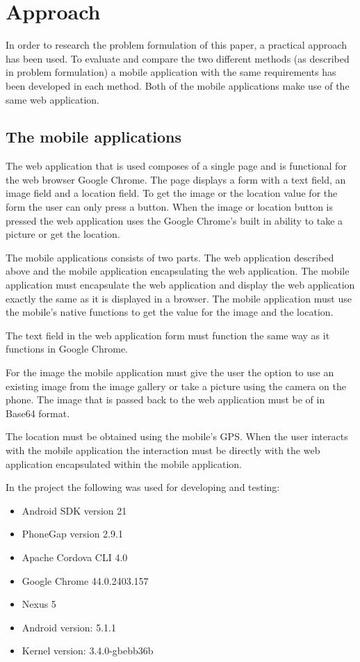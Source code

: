\chapter{Approach}
In order to research the problem formulation of this paper, a practical approach has been used. To evaluate and compare the two different methods (as described in problem formulation) a mobile application with the same requirements has been developed in each method. Both of the mobile applications make use of the same web application. 
  
\section{The mobile applications}
The web application that is used composes of a single page and is functional for the web browser Google Chrome. The page displays a form with a text field, an image field and a location field. To get the image or the location value for the form the user can only press a button. When the image or location button is pressed the web application uses the Google Chrome’s built in ability to take a picture or get the location.

The mobile applications consists of two parts. The web application described above and the mobile application encapsulating the web application. The mobile application must encapsulate the web application and display the web application exactly the same as it is displayed in a browser. The mobile application must use the mobile’s native functions to get the value for the image and the location.

The text field  in the web application form must function the same way as it functions in Google Chrome. 

For the image the mobile application must give the user the option to use an existing image from the image gallery or take a picture using the camera on the phone. The image that is passed back to the web application must be of in Base64 format. 

The location must be obtained using the mobile’s GPS. When the user interacts with the mobile application the interaction must be directly with the web application encapsulated within the mobile application. 

In the project the following was used for developing and testing:
\begin{itemize}
\item Android SDK version 21
\item PhoneGap version 2.9.1
\item Apache Cordova CLI 4.0
\item Google Chrome 44.0.2403.157
\item Nexus 5
\item Android version: 5.1.1
\item Kernel version: 3.4.0-gbebb36b
\end{itemize}

